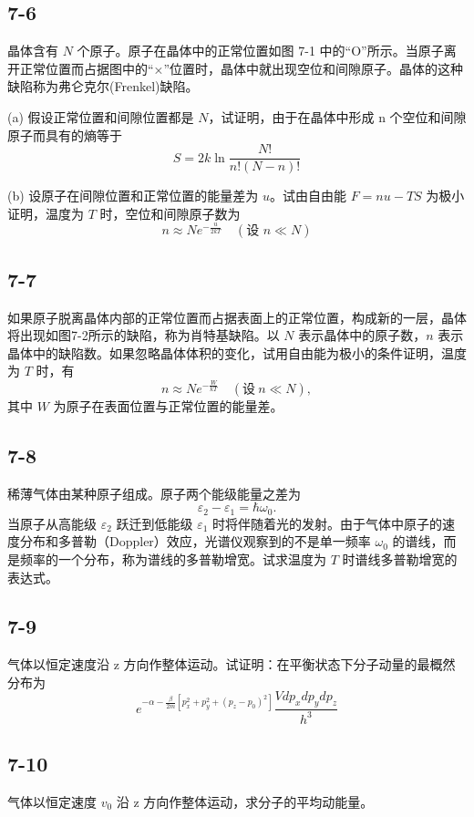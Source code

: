 \newpage
\subsection{7-6}
晶体含有 $N$ 个原子。原子在晶体中的正常位置如图 7-1 中的“O”所示。当原子离开正常位置而占据图中的“×”位置时，晶体中就出现空位和间隙原子。晶体的这种缺陷称为弗仑克尔(Frenkel)缺陷。

(a) 假设正常位置和间隙位置都是 $N$，试证明，由于在晶体中形成 n 个空位和间隙原子而具有的熵等于
$$S = 2k \ln \frac{N!}{n! (N-n)!}$$

(b) 设原子在间隙位置和正常位置的能量差为 $u$。试由自由能 $F = nu-TS$ 为极小证明，温度为 $T$ 时，空位和间隙原子数为
$$n \approx Ne^{-\frac{u}{2kT}} \quad (\text{设 } n \ll N)$$

\newpage
\subsection{7-7}
如果原子脱离晶体内部的正常位置而占据表面上的正常位置，构成新的一层，晶体将出现如图7-2所示的缺陷，称为肖特基缺陷。以 $N$ 表示晶体中的原子数，$n$ 表示晶体中的缺陷数。如果忽略晶体体积的变化，试用自由能为极小的条件证明，温度为 $T$ 时，有
$$n \approx Ne^{-\frac{W}{kT}} \quad (\text{设} \ n \ll N),$$
其中 $W$ 为原子在表面位置与正常位置的能量差。

\newpage
\subsection{7-8}
稀薄气体由某种原子组成。原子两个能级能量之差为
$$\varepsilon_2 - \varepsilon_1 = \hbar \omega_0.$$
当原子从高能级 $\varepsilon_2$ 跃迁到低能级 $\varepsilon_1$ 时将伴随着光的发射。由于气体中原子的速度分布和多普勒（Doppler）效应，光谱仪观察到的不是单一频率 $\omega_0$ 的谱线，而是频率的一个分布，称为谱线的多普勒增宽。试求温度为 $T$ 时谱线多普勒增宽的表达式。

\newpage
\subsection{7-9}
气体以恒定速度沿 z 方向作整体运动。试证明：在平衡状态下分子动量的最概然分布为
$$e^{-\alpha - \frac{\beta}{2m} [p_{x}^{2}+p_{y}^{2}+(p_{z}-p_{0})^{2}]} \frac{Vdp_{x} dp_{y} dp_{z}}{h^{3}}$$

\newpage
\subsection{7-10}
气体以恒定速度 $v_0$ 沿 z 方向作整体运动，求分子的平均动能量。

